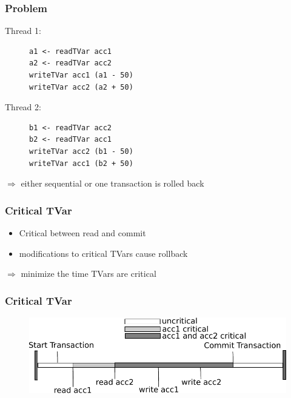 \documentclass{beamer}
\begin{document}
\begin{frame}[fragile]
    \frametitle{Problem}
    \fboxsep=0pt
    \noindent
    \begin{minipage}[t]{0.48\linewidth}
      Thread 1:
    \begin{figure}
     \begin{lstlisting}[frame=single]
a1 <- readTVar acc1
a2 <- readTVar acc2
writeTVar acc1 (a1 - 50)
writeTVar acc2 (a2 + 50)
     \end{lstlisting}
    \end{figure}
    \end{minipage}%
    \hfill%
    \begin{minipage}[t]{0.48\linewidth}
      Thread 2:
    \begin{figure}
     \begin{lstlisting}[frame=single]
b1 <- readTVar acc2
b2 <- readTVar acc1
writeTVar acc2 (b1 - 50)
writeTVar acc1 (b2 + 50)
     \end{lstlisting}
    \end{figure}
    \end{minipage}
    \vfill
    $\Rightarrow$ either sequential or one transaction is rolled back
\end{frame}


\begin{frame}
 \frametitle{Critical TVar}
   \begin{itemize}\setlength\itemsep{1em}
    \item Critical between read and commit
    \item modifications to critical TVars cause rollback
   \end{itemize}
   \pause
   \vfill
   $\Rightarrow$ minimize the time TVars are critical 
\end{frame}


  
  \begin{frame}
   \frametitle{Critical TVar}
   \begin{figure}
    \includegraphics[scale=0.7]{ressources/CriticalValue.pdf}
   \end{figure}
   \end{frame}
\end{document}
